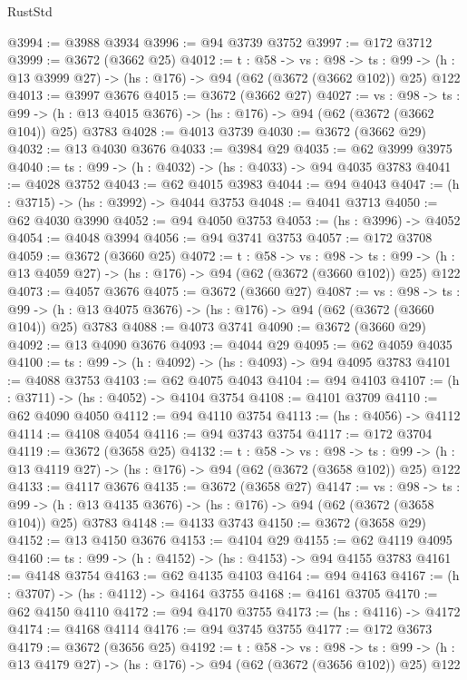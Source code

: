 \begin{lexlean}{RustStd}
\begin{coremodule}
{\begin{coremodule}
{{{{{{{{{@3994 := @3988 @3934
@3996 := @94 @3739 @3752
@3997 := @172 @3712
@3999 := @3672 (@3662 @25)
@4012 := {t : @58} ->
  {vs : @98} ->
  {ts : @99} -> (h : @13 @3999 @27) -> (hs : @176) -> @94 (@62 (@3672 (@3662 @102)) @25) @122
@4013 := @3997 @3676
@4015 := @3672 (@3662 @27)
@4027 := {vs : @98} ->
  {ts : @99} -> (h : @13 @4015 @3676) -> (hs : @176) -> @94 (@62 (@3672 (@3662 @104)) @25) @3783
@4028 := @4013 @3739
@4030 := @3672 (@3662 @29)
@4032 := @13 @4030 @3676
@4033 := @3984 @29
@4035 := @62 @3999 @3975
@4040 := {ts : @99} -> (h : @4032) -> (hs : @4033) -> @94 @4035 @3783
@4041 := @4028 @3752
@4043 := @62 @4015 @3983
@4044 := @94 @4043
@4047 := (h : @3715) -> (hs : @3992) -> @4044 @3753
@4048 := @4041 @3713
@4050 := @62 @4030 @3990
@4052 := @94 @4050 @3753
@4053 := (hs : @3996) -> @4052
@4054 := @4048 @3994
@4056 := @94 @3741 @3753
@4057 := @172 @3708
@4059 := @3672 (@3660 @25)
@4072 := {t : @58} ->
  {vs : @98} ->
  {ts : @99} -> (h : @13 @4059 @27) -> (hs : @176) -> @94 (@62 (@3672 (@3660 @102)) @25) @122
@4073 := @4057 @3676
@4075 := @3672 (@3660 @27)
@4087 := {vs : @98} ->
  {ts : @99} -> (h : @13 @4075 @3676) -> (hs : @176) -> @94 (@62 (@3672 (@3660 @104)) @25) @3783
@4088 := @4073 @3741
@4090 := @3672 (@3660 @29)
@4092 := @13 @4090 @3676
@4093 := @4044 @29
@4095 := @62 @4059 @4035
@4100 := {ts : @99} -> (h : @4092) -> (hs : @4093) -> @94 @4095 @3783
@4101 := @4088 @3753
@4103 := @62 @4075 @4043
@4104 := @94 @4103
@4107 := (h : @3711) -> (hs : @4052) -> @4104 @3754
@4108 := @4101 @3709
@4110 := @62 @4090 @4050
@4112 := @94 @4110 @3754
@4113 := (hs : @4056) -> @4112
@4114 := @4108 @4054
@4116 := @94 @3743 @3754
@4117 := @172 @3704
@4119 := @3672 (@3658 @25)
@4132 := {t : @58} ->
  {vs : @98} ->
  {ts : @99} -> (h : @13 @4119 @27) -> (hs : @176) -> @94 (@62 (@3672 (@3658 @102)) @25) @122
@4133 := @4117 @3676
@4135 := @3672 (@3658 @27)
@4147 := {vs : @98} ->
  {ts : @99} -> (h : @13 @4135 @3676) -> (hs : @176) -> @94 (@62 (@3672 (@3658 @104)) @25) @3783
@4148 := @4133 @3743
@4150 := @3672 (@3658 @29)
@4152 := @13 @4150 @3676
@4153 := @4104 @29
@4155 := @62 @4119 @4095
@4160 := {ts : @99} -> (h : @4152) -> (hs : @4153) -> @94 @4155 @3783
@4161 := @4148 @3754
@4163 := @62 @4135 @4103
@4164 := @94 @4163
@4167 := (h : @3707) -> (hs : @4112) -> @4164 @3755
@4168 := @4161 @3705
@4170 := @62 @4150 @4110
@4172 := @94 @4170 @3755
@4173 := (hs : @4116) -> @4172
@4174 := @4168 @4114
@4176 := @94 @3745 @3755
@4177 := @172 @3673
@4179 := @3672 (@3656 @25)
@4192 := {t : @58} ->
  {vs : @98} ->
  {ts : @99} -> (h : @13 @4179 @27) -> (hs : @176) -> @94 (@62 (@3672 (@3656 @102)) @25) @122
}}}}}}}}}
\end{coremodule}}
\end{coremodule}
\end{lexlean}
